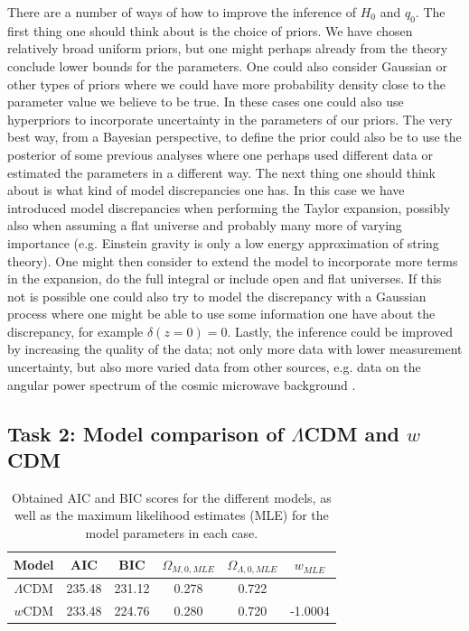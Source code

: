 \documentclass[11pt,a4paper]{article}
\begin{document}
There are a number of ways of how to improve the inference of $H_0$ and $q_0$. The first thing one should think about is the choice of priors. We have chosen relatively broad uniform priors, but one might perhaps already from the theory conclude lower bounds for the parameters. One could also consider Gaussian or other types of priors where we could have more probability density close to the parameter value we believe to be true. In these cases one could also use hyperpriors to incorporate uncertainty in the parameters of our priors. The very best way, from a Bayesian perspective, to define the prior could also be to use the posterior of some previous analyses where one perhaps used different data or estimated the parameters in a different way. The next thing one should think about is what kind of model discrepancies one has. In this case we have introduced model discrepancies when performing the Taylor expansion, possibly also when assuming a flat universe and probably many more of varying importance (e.g. Einstein gravity is only a low energy approximation of string theory). One might then consider to extend the model to incorporate more terms in the expansion, do the full integral or include open and flat universes. If this not is possible one could also try to model the discrepancy with a Gaussian process where one might be able to use some information one have about the discrepancy, for example $\delta(z = 0) = 0$. Lastly, the inference could be improved by increasing the quality of the data; not only more data with lower measurement uncertainty, but also more varied data from other sources, e.g. data on the angular power spectrum of the cosmic microwave background \cite{project_pm}.




\subsection[Task 2]{Task 2: Model comparison of $\Lambda$CDM and $w$CDM}

\begin{table}[h]
    \centering
    \caption{Obtained AIC and BIC scores for the different models, as well as the maximum likelihood estimates (MLE) for the model parameters in each case.}
    \begin{tabular}{||c | c c | c c c||} 
         \hline
         Model & AIC & BIC & $\Omega_{M,0, MLE}$ & $\Omega_{\Lambda, 0, MLE}$ & $w_{MLE}$\\ [0.5ex] 
         \hline\hline
         $\Lambda$CDM & 235.48 & 231.12 &   0.278 & 0.722 &  \\
         \hline
         $w$CDM & 233.48 & 224.76 & 0.280 &  0.720 & -1.0004 \\ [0.5ex]
         \hline
    \end{tabular}
    \label{tab:AIC_BIC}
\end{table}
\end{document}
